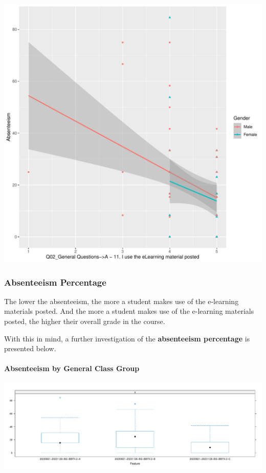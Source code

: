 \documentclass[
]{article}
\begin{document}
\includegraphics{AnalysisOfCourseEvaluation-Notebook_files/figure-latex/DrillDownCorr2-1.pdf}

\newpage

\subsubsection{Absenteeism Percentage}\label{absenteeism-percentage}

The lower the absenteeism, the more a student makes use of the
e-learning materials posted. And the more a student makes use of the
e-learning materials posted, the higher their overall grade in the
course.

With this in mind, a further investigation of the \textbf{absenteeism
percentage} is presented below.

\paragraph{Absenteeism by General Class
Group}\label{absenteeism-by-general-class-group}

\includegraphics{AnalysisOfCourseEvaluation-Notebook_files/figure-latex/AbsenteeismBoxandWhiskerGroup-1.pdf}
\end{document}
